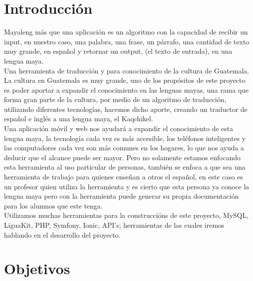 \documentclass[a4paper,openright,11pt]{article}
\begin{document}
\tableofcontents

\cleardoublepage
\listoffigures

\cleardoublepage
\listoftables

\newpage

\pagestyle{fancy}
\section{Introducci\'on}
Mayaleng más que una aplicación es un algoritmo con la capacidad de recibir un input, en nuestro caso, una palabra, una frase, un párrafo, una cantidad de texto muy grande, en español y retornar un output, (el texto de entrada), en una lengua maya. \\

Una herramienta de traducción y para conocimiento de la cultura de Guatemala.\\

La cultura en Guatemala es muy grande, uno de los propósitos de este proyecto es poder aportar a expandir el conocimiento en las lenguas mayas, una rama que forma gran parte de la cultura, por medio de un algoritmo de traducción, utilizando diferentes tecnologías, hacemos dicho aporte, creando un traductor de español e inglés a una lengua maya, el Kaqchikel.\\

Una aplicación móvil y web nos ayudará a expandir el conocimiento de esta lengua maya, la tecnología cada vez es más accesible, los teléfonos inteligentes y las computadores cada vez son más comunes en los hogares, lo que nos ayuda a deducir que el alcance puede ser mayor. Pero no solamente estamos enfocando esta herramienta al uso particular de personas, también se enfoca a que sea una herramienta de trabajo para quienes enseñan a otros el español, en este caso es un profesor quien utiliza la herramienta y es cierto que esta persona ya conoce la lengua maya pero con la herramienta puede generar su propia documentación para los alumnos que este tenga.\\

Utilizamos muchas herramientas para la construccións de este proyecto, MySQL, LiguaKit, PHP, Symfony, Ionic, API's; herramientas de las cuales iremos hablando en el desarrollo del proyecto.
\newpage

\section{Objetivos}
\end{document}
